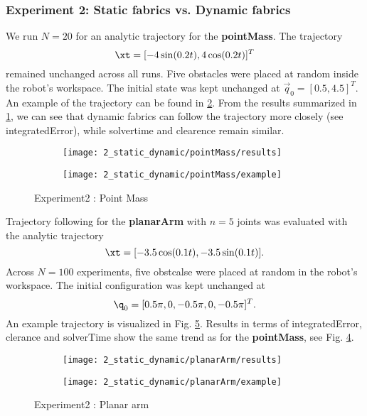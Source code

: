 \subsubsection{Experiment 2: Static fabrics vs. Dynamic fabrics}%
\label{app:sub:experiment_2_static_fabrics_vs_dynamic_fabrics}

We run $N=20$ for an analytic trajectory for the \textbf{pointMass}. The trajectory
\[
  \xt = [-4\sin(0.2t), 4\cos(0.2t)]^T
\]
remained unchanged across all runs. Five obstacles were placed at random inside the
robot's workspace. The initial state was kept unchanged at $\vec{q}_0 = [0.5, 4.5]^T$.
An example of the trajectory can be found in \ref{subfig:experiment2_pointMass_example}.
From the results summarized in \ref{subfig:experiment2_pointMass_res}, we can see that
dynamic fabrics can follow the trajectory more closely (see integratedError), while
solvertime and clearence remain similar.

\begin{figure}[ht]
  \centering
  \begin{subfigure}{0.5\linewidth}
    \centering
    \texttt{[image: 2\_static\_dynamic/pointMass/results]}
    \caption{}
    \label{subfig:experiment2_pointMass_res}
  \end{subfigure}%
  \begin{subfigure}{0.5\linewidth}
    \centering
    \texttt{[image: 2\_static\_dynamic/pointMass/example]}
    \caption{}
    \label{subfig:experiment2_pointMass_example}
  \end{subfigure}
  \caption{Experiment2 : Point Mass}%
  \label{fig:experiment2_pointMass}
\end{figure}

Trajectory following for the \textbf{planarArm} with $n=5$ joints
was evaluated with the analytic trajectory
\[
  \xt = [-3.5\cos(0.1t), -3.5\sin(0.1t)].
\]
Across $N=100$ experiments, five obstcalse were placed at random in the robot's workspace.
The initial configuration was kept unchanged at 
\[
  \q_0 = [0.5\pi, 0, -0.5\pi, 0, -0.5\pi]^T.
\]
An example trajectory is visualized in Fig. \ref{subfig:experiment2_planarArm_example}.
Results in terms of integratedError, clerance and solverTime show the same trend as for
the \textbf{pointMass}, see Fig. \ref{subfig:experiment2_planarArm_res}. 

\begin{figure}[ht]
  \centering
  \begin{subfigure}{0.5\linewidth}
    \centering
    \texttt{[image: 2\_static\_dynamic/planarArm/results]}
    \caption{}
    \label{subfig:experiment2_planarArm_res}
  \end{subfigure}%
  \begin{subfigure}{0.5\linewidth}
    \centering
    \texttt{[image: 2\_static\_dynamic/planarArm/example]}
    \caption{}
    \label{subfig:experiment2_planarArm_example}
  \end{subfigure}
  \caption{Experiment2 : Planar arm}%
  \label{fig:experiment2_planarArm}
\end{figure}

